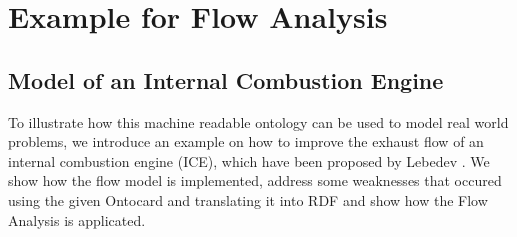 \documentclass[a4paper,11pt]{article}
\begin{document}
    \section{Example for Flow Analysis}
    \subsection{Model of an Internal Combustion Engine}

    To illustrate how this machine readable ontology can be used to model real
    world problems, we introduce an example on how to improve the exhaust
    flow of an internal combustion engine (ICE), which have been proposed by 
    Lebedev \cite{Lebedyev2015}. We show how the flow model is implemented,
    address some weaknesses that occured using the given Ontocard and 
    translating it into RDF and show how the Flow Analysis is applicated.
\end{document}
